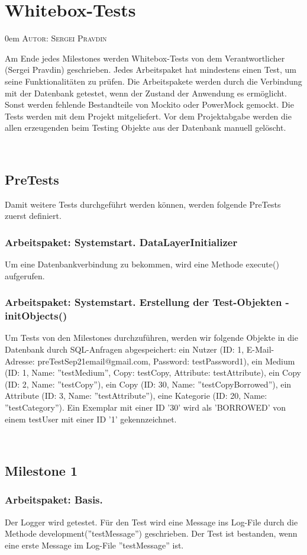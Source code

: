\documentclass{article}
\makeatletter
\newcommand{\sectionauthor}[1]{
	{\parindent 0em \large \scshape Autor: #1 \par \nobreak \vspace*{1em}}
	\@afterheading
}
\makeatother
\begin{document}
\section{Whitebox-Tests}
\sectionauthor{Sergei Pravdin}
Am Ende jedes Milestones werden Whitebox-Tests von dem Verantwortlicher (Sergei Pravdin) geschrieben. Jedes Arbeitspaket hat mindestens einen Test, um seine Funktionalitäten zu prüfen. Die Arbeitspakete werden durch die Verbindung mit der Datenbank getestet, wenn der Zustand der Anwendung es ermöglicht. Sonst werden fehlende Bestandteile von Mockito oder PowerMock gemockt. Die Tests werden mit dem Projekt mitgeliefert. Vor dem Projektabgabe werden die allen erzeugenden beim Testing Objekte aus der Datenbank manuell gelöscht. 

­\subsection{PreTests}
Damit weitere Tests durchgeführt werden können, werden folgende PreTests zuerst definiert.

\subsubsection{Arbeitspaket: Systemstart. DataLayerInitializer}
Um eine Datenbankverbindung zu bekommen, wird eine Methode execute() aufgerufen.

\subsubsection{Arbeitspaket: Systemstart. Erstellung der Test-Objekten - initObjects()}
Um Tests von den Milestones durchzuführen, werden wir folgende Objekte in die Datenbank durch SQL-Anfragen abgespeichert: ein Nutzer (ID: 1, E-Mail-Adresse:  preTestSep21email@gmail.com, Password: testPassword1), ein Medium (ID: 1, Name: ''testMedium'', Copy: testCopy, Attribute: testAttribute), ein Copy (ID: 2, Name: ''testCopy''), ein Copy (ID: 30, Name: ''testCopyBorrowed''), ein Attribute (ID: 3, Name: ''testAttribute''), eine Kategorie (ID: 20, Name: ''testCategory''). \linebreak
Ein Exemplar mit einer ID '30' wird als 'BORROWED' von einem testUser mit einer ID '1' gekennzeichnet.

­\subsection{Milestone 1}

\subsubsection{Arbeitspaket: Basis.}
Der Logger wird getestet. Für den Test wird eine Message ins Log-File durch die Methode development(''testMessage'') geschrieben. Der Test ist bestanden, wenn eine erste Message im Log-File ''testMessage'' ist.
\end{document}
